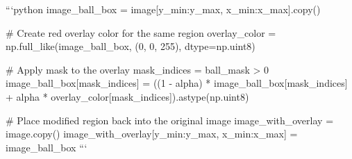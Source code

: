 ```python
image_ball_box = image[y_min:y_max, x_min:x_max].copy()

# Create red overlay color for the same region
overlay_color = np.full_like(image_ball_box, (0, 0, 255), dtype=np.uint8)

# Apply mask to the overlay
mask_indices = ball_mask > 0
image_ball_box[mask_indices] = ((1 - alpha) * image_ball_box[mask_indices] + alpha * overlay_color[mask_indices]).astype(np.uint8)

# Place modified region back into the original image
image_with_overlay = image.copy()
image_with_overlay[y_min:y_max, x_min:x_max] = image_ball_box
```






